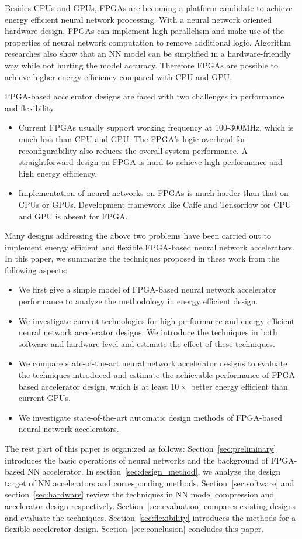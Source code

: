 Besides CPUs and GPUs, FPGAs are becoming a platform candidate to achieve energy efficient neural network processing. With a neural network oriented hardware design, FPGAs can implement high parallelism and make use of the properties of neural network computation to remove additional logic. Algorithm researches also show that an NN model can be simplified in a hardware-friendly way while not hurting the model accuracy. Therefore FPGAs are possible to achieve higher energy efficiency compared with CPU and GPU. 

FPGA-based accelerator designs are faced with two challenges in performance and flexibility:
\begin{itemize}
    \item Current FPGAs usually support working frequency at 100-300MHz, which is much less than CPU and GPU. The FPGA's logic overhead for reconfigurability also reduces the overall system performance. A straightforward design on FPGA is hard to achieve high performance and high energy efficiency.
    \item Implementation of neural networks on FPGAs is much harder than that on CPUs or GPUs. Development framework like Caffe and Tensorflow for CPU and GPU is absent for FPGA.
\end{itemize}
 
Many designs addressing the above two problems have been carried out to implement energy efficient and flexible FPGA-based neural network accelerators. In this paper, we summarize the techniques proposed in these work from the following aspects:
\begin{itemize}
    \item We first give a simple model of FPGA-based neural network accelerator performance to analyze the methodology in energy efficient design.
    \item We investigate current technologies for high performance and energy efficient neural network accelerator designs. We introduce the techniques in both software and hardware level and estimate the effect of these techniques.
    \item We compare state-of-the-art neural network accelerator designs to evaluate the techniques introduced and estimate the achievable performance of FPGA-based accelerator design, which is at least $10\times$ better energy efficient than current GPUs.
    \item We investigate state-of-the-art automatic design methods of FPGA-based neural network accelerators. 
\end{itemize}

The rest part of this paper is organized as follows: Section~\ref{sec:preliminary} introduces the basic operations of neural networks and the background of FPGA-based NN accelerator. In section~\ref{sec:design_method}, we analyze the design target of NN accelerators and corresponding methods. Section~\ref{sec:software} and section~\ref{sec:hardware} review the techniques in NN model compression and accelerator design respectively. Section~\ref{sec:evaluation} compares existing designs and evaluate the techniques. Section~\ref{sec:flexibility} introduces the methods for a flexible accelerator design. Section~\ref{sec:conclusion} concludes this paper.
